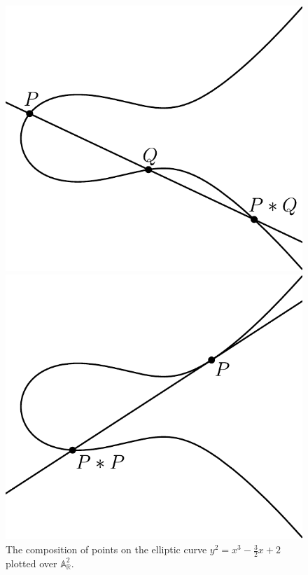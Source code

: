 \documentclass[openany, a4paper, 10pt]{book}
\theoremstyle{plain}
\theoremstyle{plain}
\theoremstyle{plain}
\theoremstyle{definition}
\theoremstyle{plain}
\theoremstyle{definition}
\theoremstyle{remark}
\begin{document}
\begin{figure}[ht]
    \centering
    \vspace{-1em}
    \begin{minipage}{.5\textwidth}
        \centering
        \includegraphics[width=.8\textwidth]{../build_plots/elliptic_curve_addition}
    \end{minipage}%
    \begin{minipage}{.5\textwidth}
        \centering
        \includegraphics[width=.8\textwidth]{../build_plots/elliptic_curve_doubling}
    \end{minipage}
    \vspace{-1em}
    \caption{The composition of points on the elliptic curve $y^2 = x^3 - \frac{3}{2}x + 2$ plotted over $\mathbb A_{\mathbb R}^2$.}
    \label{fig:composition}
\end{figure}
\end{document}
